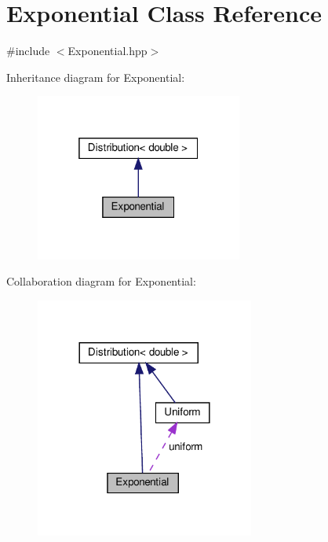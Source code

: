 \hypertarget{class_exponential}{}\section{Exponential Class Reference}
\label{class_exponential}


{\ttfamily \#include $<$Exponential.\+hpp$>$}



Inheritance diagram for Exponential\+:\nopagebreak
\begin{figure}[H]
\begin{center}
\leavevmode
\includegraphics[width=193pt]{class_exponential__inherit__graph}
\end{center}
\end{figure}


Collaboration diagram for Exponential\+:\nopagebreak
\begin{figure}[H]
\begin{center}
\leavevmode
\includegraphics[width=204pt]{class_exponential__coll__graph}
\end{center}
\end{figure}
